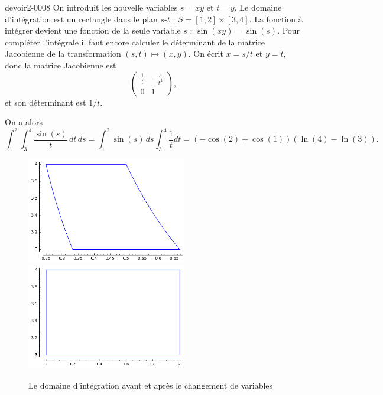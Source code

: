 \begin{corrige}{devoir2-0008}
On introduit les nouvelle variables $s=xy$ et $t=y$. Le domaine d'intégration est un rectangle dans le plan $s$-$t$ : $S= [1,2]\times [3,4]$. La fonction à intégrer devient une fonction de la seule variable $s$ : $\sin(xy)=\sin(s)$. Pour compléter l'intégrale il faut encore calculer le déterminant de la matrice Jacobienne de la transformation $(s,t)\mapsto(x,y)$. On écrit $x=s/t$ et $y=t$, donc la matrice Jacobienne est 
\begin{equation}
  \begin{pmatrix}
    \frac{1}{t} & -\frac{s}{t^2}\\
    0 & 1
  \end{pmatrix},
\end{equation}
  et son déterminant est $1/t$. 

On a alors 
\begin{equation}
  \int_1^2\int_3^ 4\frac{\sin(s)}{t}\, dt\, ds=  \int_1^2\sin(s)\,ds\int_3^ 4 \frac{1}{t}dt = \left(-\cos(2)+ \cos(1)\right)\left(\ln(4)-\ln(3)\right).
\end{equation}

\begin{figure}
  \includegraphics[width=7cm]{Fig_exo7devoir2.png}  \includegraphics[width=7cm]{Fig_exo7devoir2deuxieme.png}

  \caption{Le domaine d'intégration avant et après le changement de variables}\label{exo7devoir2}
  \end{figure}

\end{corrige}


\clearpage
